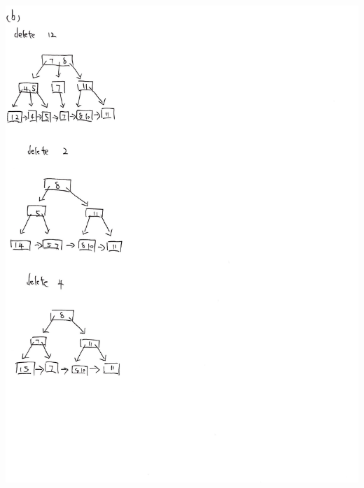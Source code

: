 \documentclass[10pt]{article}
\begin{document}
\includegraphics[width=15cm, height=20cm]{8_b}
\end{document}

